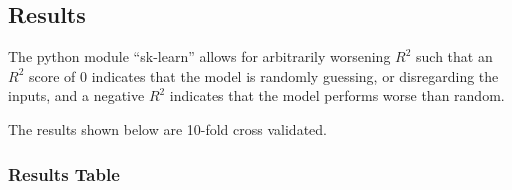 \documentclass[a4paper,english]{article}
\begin{document}
\newpage

\subsection{Results}

The python module ``sk-learn'' allows for arbitrarily worsening $R^2$ such that an $R^2$ score of $0$ indicates that the model is randomly guessing, or disregarding the inputs, and a negative $R^2$ indicates that the model performs worse than random.

The results shown below are 10-fold cross validated.

\subsubsection{Results Table}
\end{document}

